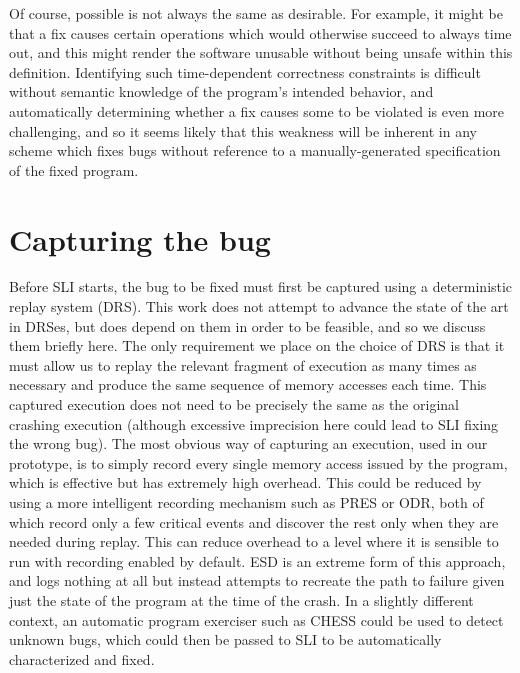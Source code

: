 \documentclass[10pt,twocolumn,preprint,natbib,authoryear]{sigplanconf}
\newcommand{\editorial}[1]{}
\begin{document}
Of course, possible is not always the same as desirable.  For example,
it might be that a fix causes certain operations which would otherwise
succeed to always time out, and this might render the software
unusable without being unsafe within this definition.  Identifying
such time-dependent correctness constraints is difficult without
semantic knowledge of the program's intended behavior, and
automatically determining whether a fix causes some to be violated is
even more challenging, and so it seems likely that this weakness will
be inherent in any scheme which fixes bugs without reference to a
manually-generated specification of the fixed program.\editorial{Not
  very happy with that phrasing.}

\section{Capturing the bug}

Before SLI starts, the bug to be fixed must first be captured using a
deterministic replay system (DRS).  This work does not attempt to
advance the state of the art in DRSes, but does depend on them in
order to be feasible, and so we discuss them briefly here.  The only
requirement we place on the choice of DRS is that it must allow us to
replay the relevant fragment of execution as many times as necessary
and produce the same sequence of memory accesses each time.  This
captured execution does not need to be precisely the same as the
original crashing execution (although excessive imprecision here could lead
to SLI fixing the wrong bug).  The most obvious way of capturing an
execution, used in our prototype, is to simply record every single
memory access issued by the program, which is effective but has
extremely high overhead.  This could be reduced by using a more
intelligent recording mechanism such as PRES or ODR\cite{Altekar2009},
both of which record only a few critical events and discover the rest
only when they are needed during replay.  This can reduce overhead to
a level where it is sensible to run with recording enabled by default.
ESD\cite{Zamfir2010} is an extreme form of this approach, and logs
nothing at all but instead attempts to recreate the path to failure
given just the state of the program at the time of the crash.  In a
slightly different context, an automatic program exerciser such as
CHESS\cite{Musuvathi2008} could be used to detect unknown bugs, which
could then be passed to SLI to be automatically characterized and
fixed.\editorial{I want to use the phrase closed-loop here}
\end{document}
